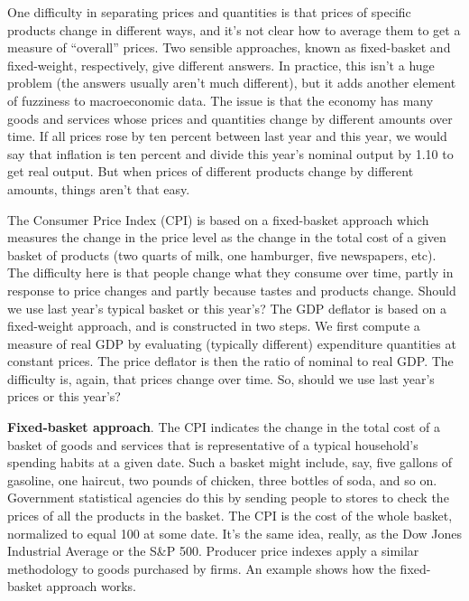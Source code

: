 
One difficulty in separating prices and quantities
is that prices of specific products change in different ways, and it's not clear how to
average them to get a measure of ``overall'' prices. Two sensible
approaches, known as fixed-basket and fixed-weight, respectively,
give different answers. In practice, this isn't a huge problem (the
answers usually aren't much different), but it adds another
element of fuzziness to macroeconomic data. The issue is that the
economy has many goods and services whose prices and quantities
change by different amounts over time. If all prices rose by ten percent
between last year and this year, we would say that inflation is ten percent and
divide this year's nominal output by 1.10 to get real output. But
when prices of different products change by different amounts,
things aren't that easy.

The Consumer Price Index (CPI) is
based on a fixed-basket approach which measures the change in the
price level as the change in the total cost of a given basket of
products (two quarts of milk, one hamburger, five newspapers,
etc). The difficulty here is that people change what they consume
over time, partly in response to price changes and partly because
tastes and products change. Should we use last year's typical
basket or this year's? The GDP deflator is based on a
fixed-weight approach, and is constructed in two steps. We first
compute a measure of real GDP by evaluating (typically
different) expenditure quantities at constant prices. The price
deflator is then the ratio of nominal to real GDP. The
difficulty is, again, that prices change over time. So, should we use
last year's prices or this year's?

\textbf{Fixed-basket approach}. The CPI indicates the change in
the total cost of a basket of goods and services that is
representative of a typical household's spending habits at a given
date. Such a basket might include, say, five gallons of gasoline,
one haircut, two pounds of chicken, three bottles of soda, and so
on. Government statistical agencies do this by sending people to
stores to check the prices of all the products in the basket. The
CPI is the cost of the whole basket, normalized to equal 100 at
some date. It's the same idea, really, as the Dow Jones Industrial
Average or the S\&P 500. Producer price indexes apply a similar
methodology to goods purchased by firms.  An example shows how the
fixed-basket approach works.

